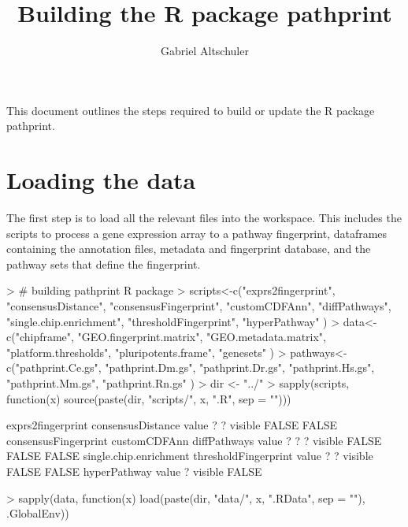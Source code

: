 \documentclass{article}
\renewenvironment{Schunk}{\vspace{\topsep}}{\vspace{\topsep}}
\begin{document}
\title{Building the R package pathprint}
\author{Gabriel Altschuler}
\maketitle
This document outlines the steps required to build or update the R package pathprint.
\section{Loading the data}
The first step is to load all the relevant files into the workspace. This includes the scripts to process a gene expression array to a pathway fingerprint, dataframes containing the annotation files, metadata and fingerprint database, and the pathway sets that define the fingerprint.
\begin{Schunk}
\begin{Sinput}
> # building pathprint R package
> scripts<-c("exprs2fingerprint",
           "consensusDistance",
           "consensusFingerprint",
           "customCDFAnn",
           "diffPathways",
           "single.chip.enrichment",
           "thresholdFingerprint",
           "hyperPathway"
           )
> data<-c("chipframe",
         "GEO.fingerprint.matrix",
         "GEO.metadata.matrix",
         "platform.thresholds",
         "pluripotents.frame",
         "genesets"
         )
> pathways<-c("pathprint.Ce.gs",
             "pathprint.Dm.gs",
             "pathprint.Dr.gs",
             "pathprint.Hs.gs",
             "pathprint.Mm.gs",
             "pathprint.Rn.gs"
             )
> dir <- "../"
> sapply(scripts, function(x){
   source(paste(dir, "scripts/", x, ".R", sep = ""))})
\end{Sinput}
\begin{Soutput}
        exprs2fingerprint consensusDistance
value   ?                 ?                
visible FALSE             FALSE            
        consensusFingerprint customCDFAnn diffPathways
value   ?                    ?            ?           
visible FALSE                FALSE        FALSE       
        single.chip.enrichment thresholdFingerprint
value   ?                      ?                   
visible FALSE                  FALSE               
        hyperPathway
value   ?           
visible FALSE       
\end{Soutput}
\begin{Sinput}
> sapply(data, function(x){
   load(paste(dir, "data/", x, ".RData", sep = ""), .GlobalEnv)})
\end{Sinput}
\begin{Soutput}

\end{Soutput}
\end{Schunk}
\end{document}
